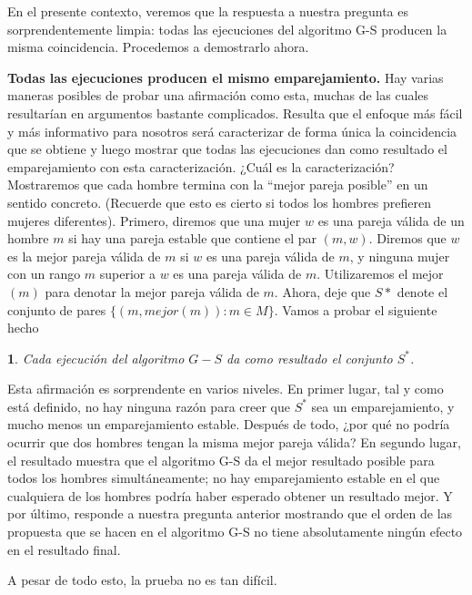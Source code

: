 \documentclass[a4paper, 12pt]{book}
\theoremstyle{dotless}
\newtheorem{theorem}{}[section]
\begin{document}
En el presente contexto, veremos que la respuesta a nuestra pregunta es sorprendentemente limpia: todas las ejecuciones del algoritmo G-S producen la misma coincidencia. Procedemos a demostrarlo ahora.

\textbf{Todas las ejecuciones producen el mismo emparejamiento.}
Hay varias maneras posibles de probar una afirmación como esta, muchas de las cuales resultarían en argumentos bastante complicados. Resulta que el enfoque más fácil y más informativo para nosotros será caracterizar de forma única la coincidencia que se obtiene y luego mostrar que todas las ejecuciones dan como resultado el emparejamiento con esta caracterización.
¿Cuál es la caracterización? Mostraremos que cada hombre termina con la ``mejor pareja posible'' en un sentido concreto. (Recuerde que esto es cierto si todos los hombres prefieren mujeres diferentes). Primero, diremos que una mujer $w$ es una pareja válida de un hombre $m$ si hay una pareja estable que contiene el par $(m, w)$. Diremos que $w$ es la mejor pareja válida de $m$ si $w$ es una pareja válida de $m$, y ninguna mujer con un rango $m$ superior a $w$ es una pareja válida de $m$. Utilizaremos el mejor $(m)$ para denotar la mejor pareja válida de $m$. Ahora, deje que $S*$ denote el conjunto de pares $\{(m, mejor (m)): m  \in  M\}$. Vamos a probar el siguiente hecho

\vspace{2mm}\noindent
\colorbox{mygray}{\parbox{\textwidth}{
\begin{theorem}
Cada ejecución del algoritmo $G-S$ da como resultado el conjunto $S^*$.
\end{theorem}
}}
\vspace{2mm}

Esta afirmación es sorprendente en varios niveles. En primer lugar, tal y como está definido, no hay ninguna razón para creer que $S^*$ sea un emparejamiento, y mucho menos un emparejamiento estable. Después de todo, ¿por qué no podría ocurrir que dos hombres tengan la misma mejor pareja válida? En segundo lugar, el resultado muestra que el algoritmo G-S da el mejor resultado posible para todos los hombres simultáneamente; no hay emparejamiento estable en el que cualquiera de los hombres podría haber esperado obtener un resultado mejor. Y por último, responde a nuestra pregunta anterior mostrando que el orden de las propuesta que se hacen en el algoritmo G-S no tiene absolutamente ningún efecto en el resultado final.

A pesar de todo esto, la prueba no es tan difícil.
\end{document}
